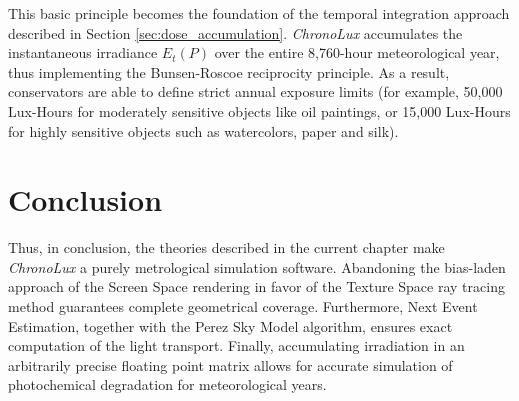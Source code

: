 This basic principle becomes the foundation of the temporal integration approach described in Section \ref{sec:dose_accumulation}. \textit{ChronoLux} accumulates the instantaneous irradiance $E_t(P)$ over the entire 8,760-hour meteorological year, thus implementing the Bunsen-Roscoe reciprocity principle. As a result, conservators are able to define strict annual exposure limits (for example, 50,000 Lux-Hours for moderately sensitive objects like oil paintings, or 15,000 Lux-Hours for highly sensitive objects such as watercolors, paper and silk).

\section{Conclusion}
Thus, in conclusion, the theories described in the current chapter make \textit{ChronoLux} a purely metrological simulation software. Abandoning the bias-laden approach of the Screen Space rendering in favor of the Texture Space ray tracing method guarantees complete geometrical coverage. Furthermore, Next Event Estimation, together with the Perez Sky Model algorithm, ensures exact computation of the light transport. Finally, accumulating irradiation in an arbitrarily precise floating point matrix allows for accurate simulation of photochemical degradation for meteorological years.